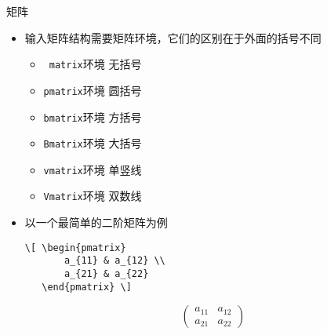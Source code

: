 \begin{frame}[fragile]{矩阵}
	\begin{itemize}
		\item 输入矩阵结构需要矩阵环境，它们的区别在于外面的括号不同
		\begin{itemize}
			\item \texttt{ matrix}环境 \quad 无括号
			\item \texttt{pmatrix}环境 \quad 圆括号
			\item \texttt{bmatrix}环境 \quad 方括号
			\item \texttt{Bmatrix}环境 \quad 大括号
			\item \texttt{vmatrix}环境 \quad 单竖线
			\item \texttt{Vmatrix}环境 \quad 双数线
		\end{itemize}
		\item 以一个最简单的二阶矩阵为例\\
		\begin{minipage}[c]{0.5\textwidth}
\begin{lstlisting}
\[ \begin{pmatrix}
       a_{11} & a_{12} \\
       a_{21} & a_{22}
   \end{pmatrix} \]
\end{lstlisting}
		\end{minipage}
		\begin{minipage}[c]{0.4\textwidth}
			\[ \begin{pmatrix}
				a_{11} & a_{12} \\
				a_{21} & a_{22}
			\end{pmatrix} \]
		\end{minipage}
	\end{itemize}
\end{frame}
